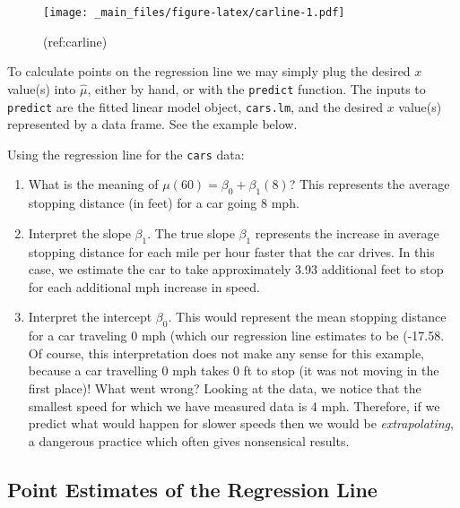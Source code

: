 \documentclass[]{book}
\providecommand{\tightlist}{%
  \setlength{\itemsep}{0pt}\setlength{\parskip}{0pt}}
\numberwithin{equation}{chapter}
\numberwithin{figure}{chapter}
\theoremstyle{plain}
\theoremstyle{definition}
\theoremstyle{remark}
\theoremstyle{definition}
\theoremstyle{definition}
\theoremstyle{remark}
\let\BeginKnitrBlock\begin \let\EndKnitrBlock\end
\begin{document}
\begin{figure}[htbp]
\centering
\texttt{[image: \_main\_files/figure-latex/carline-1.pdf]}
\caption{\label{fig:carline}(ref:carline)}
\end{figure}




To calculate points on the regression line we may simply plug the
desired \(x\) value(s) into \(\hat{\mu}\), either by hand, or with the
\texttt{predict} function. The inputs to \texttt{predict} are the fitted
linear model object, \texttt{cars.lm}, and the desired \(x\) value(s)
represented by a data frame. See the example below.

\bigskip

\BeginKnitrBlock{example}
\protect\hypertarget{ex:regline-cars-interpret}{}{\label{ex:regline-cars-interpret}}Using
the regression line for the \texttt{cars} data:
\EndKnitrBlock{example}

\begin{enumerate}
\def\labelenumi{\arabic{enumi}.}
\tightlist
\item
  What is the meaning of \(\mu(60) = \beta_{0} + \beta_{1}(8)\)? This
  represents the average stopping distance (in feet) for a car going 8
  mph.
\item
  Interpret the slope \(\beta_{1}\). The true slope \(\beta_{1}\)
  represents the increase in average stopping distance for each mile per
  hour faster that the car drives. In this case, we estimate the car to
  take approximately 3.93 additional feet to stop for each additional
  mph increase in speed.
\item
  Interpret the intercept \(\beta_{0}\). This would represent the mean
  stopping distance for a car traveling 0 mph (which our regression line
  estimates to be (-17.58. Of course, this interpretation does not make
  any sense for this example, because a car travelling 0 mph takes 0 ft
  to stop (it was not moving in the first place)! What went wrong?
  Looking at the data, we notice that the smallest speed for which we
  have measured data is 4 mph. Therefore, if we predict what would
  happen for slower speeds then we would be \emph{extrapolating}, a
  dangerous practice which often gives nonsensical results.
\end{enumerate}

\subsection{Point Estimates of the Regression
Line}\label{sub-slr-point-est-regline}
\end{document}
